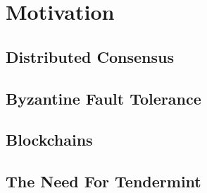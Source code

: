 \chapter{Motivation}

\section{Distributed Consensus}

\section{Byzantine Fault Tolerance}

\section{Blockchains}

\section{The Need For Tendermint}
